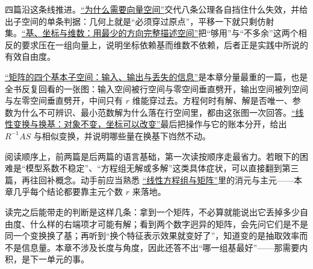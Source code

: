 四篇沿这条线推进。\hyperref[sec:03-Linear-Algebra/02-Vector-Spaces/01]{``为什么需要向量空间''}交代八条公理各自挡住什么失效，并给出子空间的单条判据：几何上就是``必须穿过原点''，平移一下就只剩仿射集。\hyperref[sec:03-Linear-Algebra/02-Vector-Spaces/02]{``基、坐标与维数：用最少的方向完整描述空间''}把``够用''与``不多余''这两个相反的要求压在一组向量上，说明坐标依赖基而维数不依赖，后者正是实践中所说的有效自由度。

\hyperref[sec:03-Linear-Algebra/02-Vector-Spaces/03]{``矩阵的四个基本子空间：输入、输出与丢失的信息''}是本章分量最重的一篇，也是全书反复回看的一张图：输入空间被行空间与零空间垂直劈开，输出空间被列空间与左零空间垂直劈开，中间只有 \(r\) 维能穿过去。方程何时有解、解是否唯一、参数为什么不可辨识、最小范数解为什么落在行空间里，都由这张图一次回答。\hyperref[sec:03-Linear-Algebra/02-Vector-Spaces/04]{``线性变换与换基：对象不变，坐标可以改变''}最后把操作与它的账本分开，给出 \(R^{-1}AS\) 与相似变换，并说明哪些量在换基下岿然不动。

阅读顺序上，前两篇是后两篇的语言基础，第一次读按顺序走最省力。若眼下的困难是``模型系数不稳定''、``方程组无解或多解''这类具体症状，可以直接翻到第三篇，再往回补概念。动手前应当熟悉 \hyperref[ch:016]{``线性方程组与矩阵''}里的消元与主元——本章几乎每个结论都要靠主元个数 \(r\) 来落地。

读完之后能带走的判断是这样几条：拿到一个矩阵，不必算就能说出它丢掉多少自由度、什么样的右端项才可能有解；看到两个数字迥异的矩阵，会先问它们是不是同一个变换换了基；再听到``换个特征表示效果就变好了''，知道变的是抽取效率而不是信息量。本章不涉及长度与角度，因此还答不出``哪一组基最好''——那需要内积，是下一单元的事。
